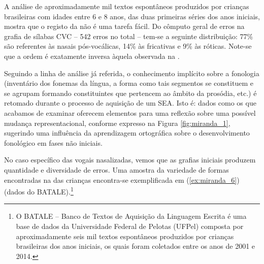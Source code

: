 \documentclass[output=paper]{LSP/langsci}
\begin{document}
\largerpage[2]
A análise de aproximadamente mil textos espontâneos produzidos por crianças brasileiras com idades entre 6 e 8 anos, das duas primeiras séries dos anos iniciais, mostra que o registo da  não é uma tarefa fácil. Do cômputo geral de erros na grafia de sílabas CVC -- 542 erros no total -- tem-se a seguinte distribuição: 77\% são referentes às nasais pós-vocálicas, 14\% às fricativas e 9\% às róticas. Note-se que a ordem é exatamente inversa àquela observada na . 

Seguindo a linha de análise já referida, o conhecimento implícito sobre a fonologia (inventário dos fonemas da língua, a forma como tais segmentos se constituem e se agrupam formando constituintes que pertencem ao âmbito da prosódia, etc.) é retomado durante o processo de aquisição de um SEA. Isto é: dados como os que acabamos de examinar oferecem elementos para uma reflexão sobre uma possível mudança representacional, conforme expresso na Figura \ref{fig:miranda_1}, sugerindo uma influência da aprendizagem ortográfica sobre o desenvolvimento fonológico em fases não iniciais. 

No caso específico das vogais nasalizadas, vemos que as grafias iniciais produzem quantidade e diversidade de erros. Uma amostra da variedade de formas encontradas na  das crianças encontra-se exemplificada em (\ref{ex:miranda_6}) (dados do BATALE).\footnote{O BATALE – Banco de Textos de Aquisição da Linguagem Escrita é uma base de dados da Universidade Federal de Pelotas (UFPel) composta por aproximadamente seis mil textos espontâneos produzidos por crianças brasileiras dos anos iniciais, os quais foram coletados entre os anos de 2001 e 2014.}

\ea\label{ex:miranda_6}
\z
\z
\end{document}
